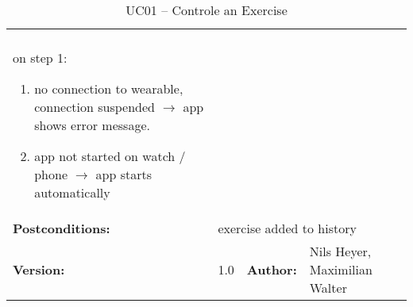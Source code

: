\begin{table}[H]
\begin{tabular}{|l|l|l|l|l|l|}
{{			$ $\\on step 1:
			\begin{enumerate}
				\item no connection to wearable, connection suspended $\rightarrow$ app shows error message.
				\item app not started on watch / phone $\rightarrow$ app starts automatically
			\end{enumerate}
		}} \\ \hline
		\textbf{Postconditions:} & \multicolumn{5}{l|}{exercise added to history} \\ \hline
		\textbf{Version:} & \multicolumn{2}{l|}{1.0} & \textbf{Author:} & \multicolumn{2}{l|}{Nils Heyer, Maximilian Walter} \\ \hline
	\end{tabular}
	\caption{UC01 -- Controle an Exercise}
	\label{cae}
\end{table}


